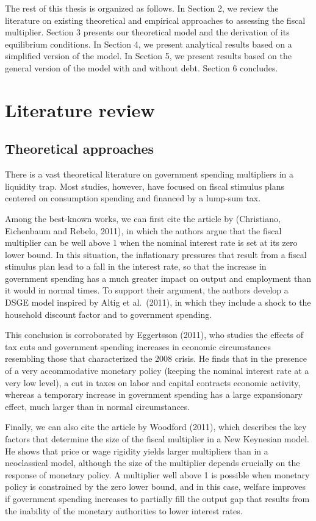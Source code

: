 \documentclass[12pt,letterpaper]{article}
\begin{document}
The rest of this thesis is organized as follows. In Section 2, we review the literature on existing theoretical and empirical approaches to assessing the fiscal multiplier. Section 3 presents our theoretical model and the derivation of its equilibrium conditions. In Section 4, we present analytical results based on a simplified version of the model. In Section 5, we present results based on the general version of the model with and without debt. Section 6 concludes.

\section{Literature review}

\subsection{Theoretical approaches}

There is a vast theoretical literature on government spending multipliers in a liquidity trap. Most studies, however, have focused on fiscal stimulus plans centered on consumption spending and financed by a lump-sum tax.

Among the best-known works, we can first cite the article by (Christiano, Eichenbaum and Rebelo, 2011), in which the authors argue that the fiscal multiplier can be well above 1 when the nominal interest rate is set at its zero lower bound. In this situation, the inflationary pressures that result from a fiscal stimulus plan lead to a fall in the interest rate, so that the increase in government spending has a much greater impact on output and employment than it would in normal times. To support their argument, the authors develop a DSGE model inspired by Altig et al.\ (2011), in which they include a shock to the household discount factor and to government spending.

This conclusion is corroborated by Eggertsson (2011), who studies the effects of tax cuts and government spending increases in economic circumstances resembling those that characterized the 2008 crisis. He finds that in the presence of a very accommodative monetary policy (keeping the nominal interest rate at a very low level), a cut in taxes on labor and capital contracts economic activity, whereas a temporary increase in government spending has a large expansionary effect, much larger than in normal circumstances.

Finally, we can also cite the article by Woodford (2011), which describes the key factors that determine the size of the fiscal multiplier in a New Keynesian model. He shows that price or wage rigidity yields larger multipliers than in a neoclassical model, although the size of the multiplier depends crucially on the response of monetary policy. A multiplier well above 1 is possible when monetary policy is constrained by the zero lower bound, and in this case, welfare improves if government spending increases to partially fill the output gap that results from the inability of the monetary authorities to lower interest rates.
\end{document}
